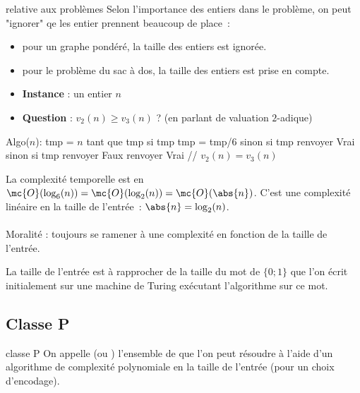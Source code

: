 \begin{adjustwidth}{-3cm}{-3cm}
\begin{remarque}{}{relative aux problèmes}
    Selon l'importance des entiers dans le problème, on peut "ignorer" qe les entier prennent beaucoup de place~:
    \begin{itemize}
        \item pour un graphe pondéré, la taille des entiers est ignorée.
        \item pour le problème du sac à dos, la taille des entiers est prise en compte.
    \end{itemize}
\end{remarque}

\begin{exemple}{}{}
    \begin{itemize}
        \item \textbf{Instance} : un entier $n$
        \item \textbf{Question} : $v_2(n) \geq v_3(n)$ ? (en parlant de valuation $2$-adique)
    \end{itemize}
    \begin{lstLNat}
    Algo($n$):
        tmp = $n$
        tant que tmp%
            si tmp%
                tmp = tmp/6
            sinon si tmp%
                renvoyer Vrai
            sinon si tmp%
                renvoyer Faux
        renvoyer Vrai // $v_2(n) = v_3(n)$
    \end{lstLNat}
    La complexité temporelle est en $\mc{O}(\log_6(n)) = \mc{O}(\log_2(n)) = \mc{O}(\abs{n})$. C'est une complexité linéaire en la taille de l'entrée~: $\abs{n} = \log_2(n)$.\\\\
    Moralité : toujours se ramener à une complexité en fonction de la taille de l'entrée.
\end{exemple}

\begin{remarque}{}{}
    La taille de l'entrée est à rapprocher de la taille du mot de $\{0;1\}$ que l'on écrit initialement sur une machine de Turing exécutant l'algorithme sur ce mot.
\end{remarque}

\subsection{Classe P}

\begin{definition}{}{classe P}
    On appelle  (ou ) l'ensemble de  que l'on peut résoudre à l'aide d'un algorithme de complexité polynomiale en la taille de l'entrée (pour un choix d'encodage).
\end{definition}


\end{adjustwidth}
